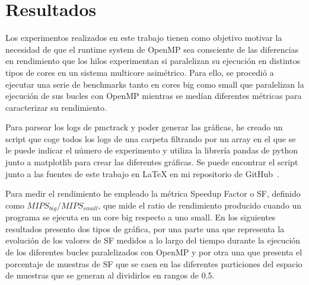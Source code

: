 \section{Resultados}\label{sec:results}

Los experimentos realizados en este trabajo tienen como objetivo motivar la necesidad de que el runtime system de OpenMP sea consciente de las diferencias en rendimiento que los hilos experimentan si paralelizan su ejecución en distintos tipos de cores en un sistema multicore asimétrico. Para ello, se procedió a ejecutar una serie de benchmarks tanto en cores big como small que paralelizan la ejecución de sus bucles con OpenMP mientras se medían diferentes métricas para caracterizar su rendimiento. 

Para parsear los logs de pmctrack y poder generar las gráficas, he creado un script que coge todos los logs de una carpeta filtrando por un array en el que se le puede indicar el número de experimento y utiliza la librería pandas de python junto a matplotlib para crear las diferentes gráficas. Se puede encontrar el script junto a las fuentes de este trabajo en LaTeX en mi repositorio de GitHub~\cite{parsing}.

Para medir el rendimiento he empleado la métrica Speedup Factor o SF, definido como ${MIPS}_{big}/{MIPS}_{small}$, que mide el ratio de rendimiento producido cuando un programa se ejecuta en un core big respecto a uno small. En los siguientes resultados presento dos tipos de gráfica, por una parte una que representa la evolución de los valores de SF medidos a lo largo del tiempo durante la ejecución de los diferentes bucles paralelizados con OpenMP y por otra una que presenta el porcentaje de muestras de SF que se caen en las diferentes particiones del espacio de muestras que se generan al dividirlos en rangos de 0.5.

